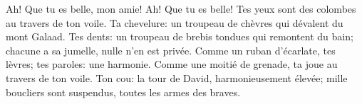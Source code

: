 Ah! Que tu es belle, mon amie! Ah! Que tu es belle!
	Tes yeux sont des colombes au travers de ton voile.
Ta chevelure: un troupeau de chèvres qui dévalent du mont Galaad.
Tes dents: un troupeau de brebis tondues qui remontent du bain;
	chacune a sa jumelle, nulle n’en est privée.
Comme un ruban d’écarlate, tes lèvres; tes paroles: une harmonie.
	Comme une moitié de grenade, ta joue au travers de ton voile.
Ton cou: la tour de David, harmonieusement élevée;
	mille boucliers sont suspendus, toutes les armes des braves.
